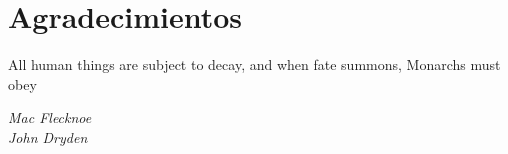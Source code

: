 \chapter*{Agradecimientos}

\epigraph{All human things are subject to decay, and when fate summons, Monarchs must obey}{\textit{Mac Flecknoe \\ John Dryden}}

\lipsum

\newpage
\thispagestyle{empty}
